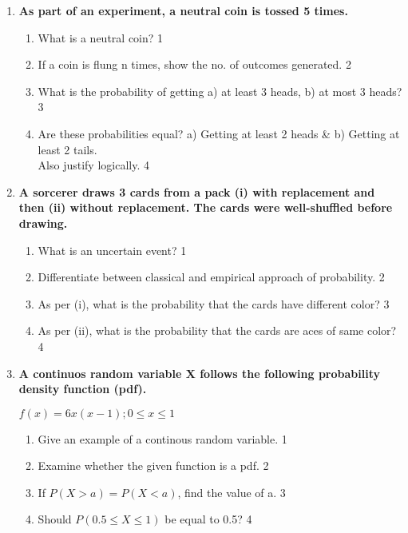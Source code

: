 \documentclass{article}
\begin{document}
  \begin{enumerate}
  
    \item
	  \textbf{As part of an experiment, a neutral coin is tossed 5 times.} 
  
  \begin{enumerate}
    \item
	What is a neutral coin? \hfill 1
    \item
	If a coin is flung n times, show the no. of outcomes generated. \hfill 2
    \item  
	What is the probability of getting a) at least 3 heads, b) at most 3 heads? \hfill 3
    \item
	Are these probabilities equal? a) Getting at least 2 heads \& b) Getting at least 2 tails. \\ Also justify logically. \hfill 4
  \end{enumerate}
  
   \item
	  \textbf{A sorcerer draws 3 cards from a pack (i) with replacement and then (ii) without replacement. The cards were well-shuffled before drawing.} 
  
  \begin{enumerate}
    \item
	What is an uncertain event? \hfill 1
    \item
	Differentiate between classical and empirical approach of probability.  \hfill 2
    \item  
	As per (i), what is the probability that the cards have different color? \hfill 3
    \item
	As per (ii), what is the probability that the cards are aces of same color?  \hfill 4
  \end{enumerate}
  
     \item
	  \textbf{A continuos random variable X follows the following probability density function (pdf).} 
	  \begin{center}
	  $f(x) = 6x(x-1); 0\le x\le 1$
  \end{center}
  
  \begin{enumerate}
    \item
	Give an example of a continous random variable. \hfill 1
    \item
	Examine whether the given function is a pdf. \hfill 2
    \item  
	If $P(X>a) = P(X<a)$, find the value of a. \hfill 3
    \item
	Should $P(0.5 \le X \le 1)$  be equal to 0.5? \hfill 4
  \end{enumerate}


\end{enumerate}
\end{document}

